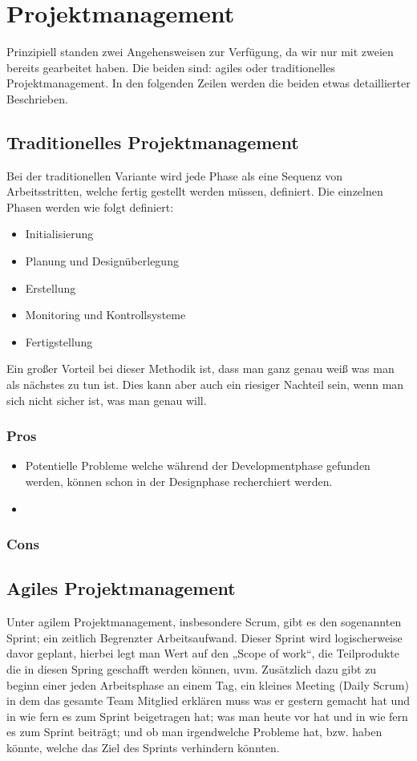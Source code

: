 \chapter{Projektmanagement}

Prinzipiell standen zwei Angehensweisen zur Verfügung, da wir nur mit zweien bereits gearbeitet haben. Die beiden sind: agiles oder traditionelles Projektmanagement.
In den folgenden Zeilen werden die beiden etwas detaillierter Beschrieben.

\section{Traditionelles Projektmanagement}
Bei der traditionellen Variante wird jede Phase als eine Sequenz von Arbeitsstritten, welche fertig gestellt werden müssen, definiert. Die einzelnen Phasen werden wie folgt definiert:
\begin{itemize}
		\item Initialisierung
		\item Planung und Designüberlegung
		\item Erstellung
		\item Monitoring und Kontrollsysteme
		\item Fertigstellung
\end{itemize}

Ein großer Vorteil bei dieser Methodik ist, dass man ganz genau weiß was man als nächstes zu tun ist. Dies kann aber auch ein riesiger Nachteil sein, wenn man sich nicht sicher ist, was man genau will.

\subsection{Pros}
\begin{itemize}
		\item Potentielle Probleme welche während der Developmentphase gefunden werden, können schon in der Designphase recherchiert werden.
		\item 
\end{itemize}

\subsection{Cons}

\newpage

\section{Agiles Projektmanagement}
Unter agilem Projektmanagement, insbesondere Scrum, gibt es den sogenannten Sprint; ein zeitlich Begrenzter Arbeitsaufwand. Dieser Sprint wird logischerweise davor geplant, hierbei legt man Wert auf den „Scope of work“, die Teilprodukte die in diesen Spring geschafft werden können, uvm. Zusätzlich dazu gibt zu beginn einer jeden Arbeitsphase an einem Tag, ein kleines Meeting (Daily Scrum) in dem das gesamte Team Mitglied erklären muss was er gestern gemacht hat und in wie fern es zum Sprint beigetragen hat; was man heute vor hat und in wie fern es zum Sprint beiträgt; und ob man irgendwelche Probleme hat, bzw. haben könnte, welche das Ziel des Sprints verhindern könnten.

